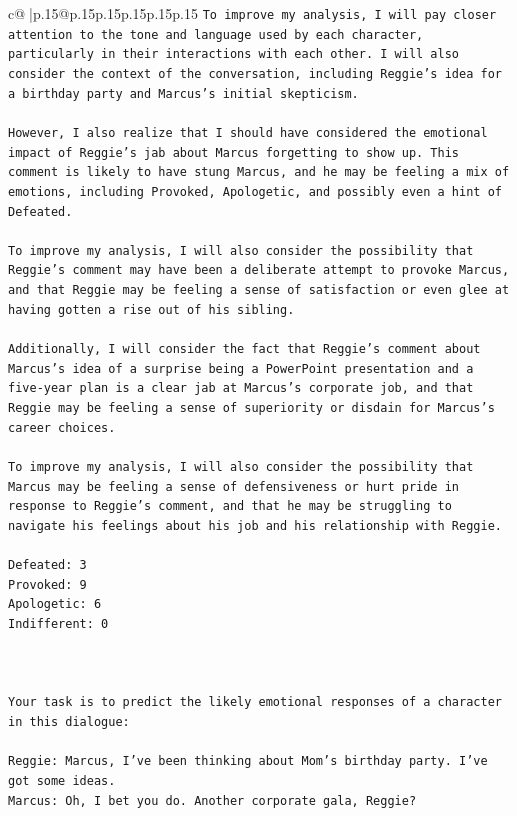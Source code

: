 \documentclass{article}
\begin{document}
{\begin{supertabular}{c@{$\;$}|p{.15\linewidth}@{}p{.15\linewidth}p{.15\linewidth}p{.15\linewidth}p{.15\linewidth}p{.15\linewidth}}
{{{\texttt{To improve my analysis, I will pay closer attention to the tone and language used by each character, particularly in their interactions with each other. I will also consider the context of the conversation, including Reggie's idea for a birthday party and Marcus's initial skepticism.} \\
\\ 
\texttt{However, I also realize that I should have considered the emotional impact of Reggie's jab about Marcus forgetting to show up. This comment is likely to have stung Marcus, and he may be feeling a mix of emotions, including Provoked, Apologetic, and possibly even a hint of Defeated.} \\
\\ 
\texttt{To improve my analysis, I will also consider the possibility that Reggie's comment may have been a deliberate attempt to provoke Marcus, and that Reggie may be feeling a sense of satisfaction or even glee at having gotten a rise out of his sibling.} \\
\\ 
\texttt{Additionally, I will consider the fact that Reggie's comment about Marcus's idea of a surprise being a PowerPoint presentation and a five{-}year plan is a clear jab at Marcus's corporate job, and that Reggie may be feeling a sense of superiority or disdain for Marcus's career choices.} \\
\\ 
\texttt{To improve my analysis, I will also consider the possibility that Marcus may be feeling a sense of defensiveness or hurt pride in response to Reggie's comment, and that he may be struggling to navigate his feelings about his job and his relationship with Reggie.} \\
\\ 
\texttt{Defeated: 3} \\
\texttt{Provoked: 9} \\
\texttt{Apologetic: 6} \\
\texttt{Indifferent: 0} \\
\\ 
\\ 
\\ 
\texttt{Your task is to predict the likely emotional responses of a character in this dialogue:} \\
\\ 
\texttt{Reggie: Marcus, I've been thinking about Mom's birthday party. I've got some ideas.} \\
\texttt{Marcus: Oh, I bet you do. Another corporate gala, Reggie? } \\
}}}
\end{supertabular}}
\end{document}
